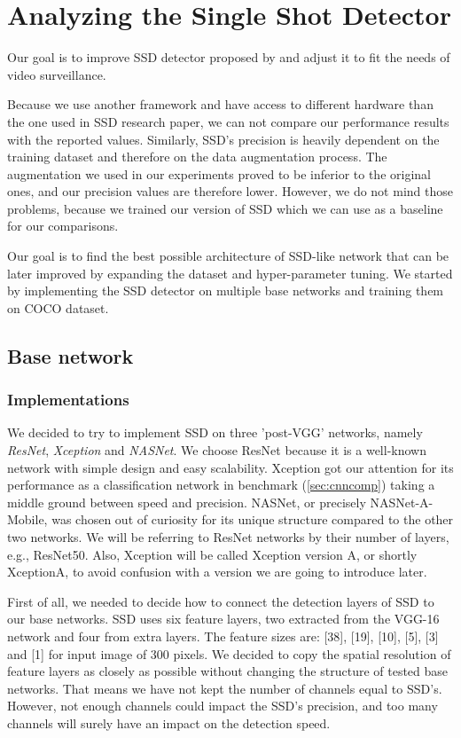 \chapter{Analyzing the Single Shot Detector}


Our goal is to improve SSD detector proposed by \citeauthor{bib:ssd} and adjust it to fit the needs of video surveillance.  

Because we use another framework and have access to different hardware than the one used in SSD research paper, we can not compare our performance results with the reported values. Similarly, SSD's precision is heavily dependent on the training dataset and therefore on the data augmentation process. The augmentation we used in our experiments proved to be inferior to the original ones, and our precision values are therefore lower. However, we do not mind those problems, because we trained our version of SSD which we can use as a baseline for our comparisons. 

Our goal is to find the best possible architecture of SSD-like network that can be later improved by expanding the dataset and hyper-parameter tuning. We started by implementing the SSD detector on multiple base networks and training them on COCO dataset. 


\section{Base network}

\subsection{Implementations}
We decided to try to implement SSD on three 'post-VGG' networks, namely \textit{ResNet}, \textit{Xception} and \textit{NASNet}. We choose ResNet because it is a well-known network with simple design and easy scalability. Xception got our attention for its performance as a classification network in \citeauthor{bib:cnnbenchmark} benchmark (\cref{sec:cnncomp}) taking a middle ground between speed and precision. NASNet, or precisely NASNet-A-Mobile, was chosen out of curiosity for its unique structure compared to the other two networks. We will be referring to ResNet networks by their number of layers, e.g., ResNet50. Also, Xception will be called Xception version A, or shortly XceptionA, to avoid confusion with a version we are going to introduce later.

First of all, we needed to decide how to connect the detection layers of SSD to our base networks. SSD uses six feature layers, two extracted from the VGG-16 network and four from extra layers. The feature sizes are: [38], [19], [10], [5], [3] and [1] for input image of 300 pixels. We decided to copy the spatial resolution of feature layers as closely as possible without changing the structure of tested base networks. That means we have not kept the number of channels equal to SSD's. However, not enough channels could impact the SSD's precision, and too many channels will surely have an impact on the detection speed.

